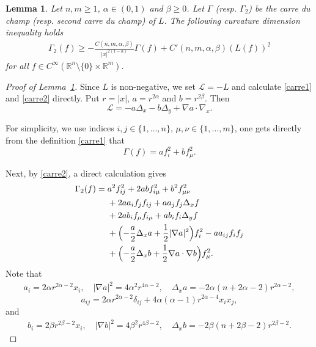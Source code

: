 \documentclass[12pt]{amsart}
\theoremstyle{plain}
\newtheorem{lemma}[theorem]{Lemma}
\theoremstyle{definition}
\numberwithin{equation}{section}
\begin{document}
\begin{lemma}\label{le_Ric_Grushin}
Let $n,m\ge 1$, $\alpha \in (0,1)$ and $\beta \ge 0$. Let $\Gamma$ (resp. $\Gamma_2$) be the \textit{carre du champ} (resp. second \textit{carre du champ}) of $L$. The following curvature dimension inequality holds
\begin{align*}
\Gamma_2(f) \ge - \frac{C(n,m,\alpha,\beta)}{|x|^{2(1-\alpha)}} \Gamma(f) + C'(n,m,\alpha,\beta) \left(L(f) \right)^2
\end{align*}
for all $f\in C^\infty( \mathbb{R}^{n}\setminus\{0\} \times \mathbb{R}^m)$.
\end{lemma}

\begin{proof}[Proof of Lemma~\ref{le_Ric_Grushin}]
Since $L$ is non-negative, we set $\mathcal{L} = -L$ and calculate \eqref{carre1} and \eqref{carre2} directly. Put $r=|x|$, $a = r^{2\alpha}$ and $b=r^{2\beta}$. Then
\begin{equation*}
\mathcal L = -a\Delta_x - b\Delta_y+\nabla a\cdot \nabla_x.
\end{equation*}

For simplicity, we use indices $i,j\in\{1,\dots,n\}$, $\mu,\nu\in\{1,\dots,m\}$, one gets directly from the definition \eqref{carre1} that
\begin{equation}\label{eq_gamma1}
    \Gamma(f)=a f_i^2+b f_\mu^2.
\end{equation}

Next, by \eqref{carre2}, a direct calculation gives
\begin{align}\label{eq_gamma2}
\Gamma_2(f)
={}&a^2 f_{ij}^2+2ab f_{i\mu}^2+b^2 f_{\mu\nu}^2\\ \nonumber
&+2a a_i f_j f_{ij} + a a_j f_j \Delta_x f\\ \nonumber
&+2a b_i f_\mu f_{i\mu}+ a b_i f_i \Delta_y f\\ \nonumber
&+\Bigl(-\frac a2 \Delta_x a+\frac12|\nabla a|^2\Bigr)f_i^2
-a a_{ij}f_i f_j\\ \nonumber
&+\Bigl(-\frac a2 \Delta_x b+\frac12\nabla a\cdot \nabla b\Bigr)f_\mu^2.
\end{align}
Note that
\begin{align*}
    a_i=2\alpha r^{2\alpha-2}x_i,\quad
|\nabla a|^2 = 4\alpha^2 r^{4\alpha-2},
\quad
\Delta_x a = -2\alpha(n+2\alpha-2)r^{2\alpha-2},
\end{align*}
\begin{equation*}
    a_{ij} = 2\alpha r^{2\alpha-2}\delta_{ij}
 + 4\alpha(\alpha-1)r^{2\alpha-4}x_i x_j,
\end{equation*}
and 
\begin{align*}
    b_i = 2\beta r^{2\beta-2}x_i,\quad
|\nabla b|^2 = 4\beta^2 r^{4\beta-2},
\quad
\Delta_x b = -2\beta(n+2\beta-2)r^{2\beta-2}.
\end{align*}



\end{proof}
\end{document}
